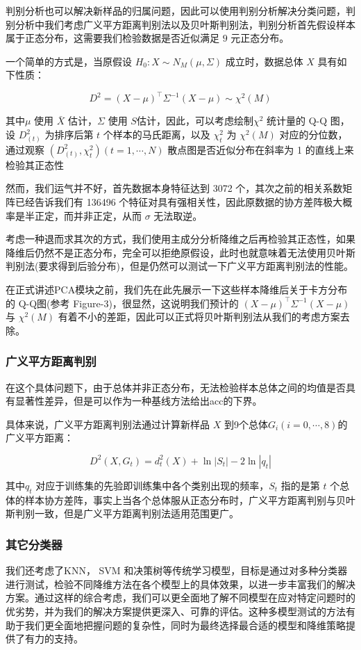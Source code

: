 \documentclass[fleqn]{Paquetes/RevDigMatEduInt}
\begin{document}
判别分析也可以解决新样品的归属问题，因此可以使用判别分析解决分类问题，判别分析中我们考虑广义平方距离判别法以及贝叶斯判别法，判别分析首先假设样本属于正态分布，这需要我们检验数据是否近似满足 $9$ 元正态分布。


一个简单的方式是，当原假设 $H_0:X\sim N_M(\mu,\Sigma)$ 成立时，数据总体 $X$ 具有如下性质：

\begin{lema}
	$$D^2 = (X - \mu)^\top \Sigma^{-1} (X - \mu) \sim \chi^2(M)$$
\end{lema}

其中$\mu$ 使用 $\bar{X}$ 估计，$\Sigma$ 使用 $S $估计，因此，可以考虑绘制$\chi^2$ 统计量的 Q-Q 图，设 $D_{(t)}^2$ 为排序后第 $t$ 个样本的马氏距离，以及 $\chi_t^2$ 为 $\chi^2(M)$ 对应的分位数，通过观察 $(D_{(t)}^2,\chi_t^2)(t = 1,\cdots,N)$ 散点图是否近似分布在斜率为 1 的直线上来检验其正态性

然而，我们运气并不好，首先数据本身特征达到 3072 个，其次之前的相关系数矩阵已经告诉我们有 136496 个特征对具有强相关性，因此原数据的协方差阵极大概率是半正定，而并非正定，从而 $\sigma$ 无法取逆。

考虑一种退而求其次的方式，我们使用主成分分析降维之后再检验其正态性，如果降维后仍然不是正态分布，完全可以拒绝原假设，此时也就意味着无法使用贝叶斯判别法(要求得到后验分布)，但是仍然可以测试一下广义平方距离判别法的性能。

在正式讲述PCA模块之前，我们先在此先展示一下这些样本降维后关于卡方分布的 Q-Q图(参考 Figure-3)，很显然，这说明我们预计的 $ (X - \mu)^\top \Sigma^{-1} (X - \mu)$ 与 $\chi^2(M)$ 有着不小的差距，因此可以正式将贝叶斯判别法从我们的考虑方案去除。

\subsubsection{广义平方距离判别}
在这个具体问题下，由于总体并非正态分布，无法检验样本总体之间的均值是否具有显著性差异，但是可以作为一种基线方法给出acc的下界。

具体来说，广义平方距离判别法通过计算新样品 $X$ 到9个总体$G_i(i=0,\cdots,8)$的广义平方距离：



$$
D^2(X,G_t) = d_t^2(X) + \ln |S_t| - 2\ln | q_t| 
$$

其中$q_t$ 对应于训练集的先验即训练集中各个类别出现的频率，$S_t$ 指的是第 $t$ 个总体的样本协方差阵，事实上当各个总体服从正态分布时，广义平方距离判别与贝叶斯判别一致，但是广义平方距离判别法适用范围更广。
 
\subsubsection{其它分类器}
我们还考虑了KNN， SVM 和决策树等传统学习模型，目标是通过对多种分类器进行测试，检验不同降维方法在各个模型上的具体效果，以进一步丰富我们的解决方案。通过这样的综合考虑，我们可以更全面地了解不同模型在应对特定问题时的优劣势，并为我们的解决方案提供更深入、可靠的评估。这种多模型测试的方法有助于我们更全面地把握问题的复杂性，同时为最终选择最合适的模型和降维策略提供了有力的支持。
\end{document}
